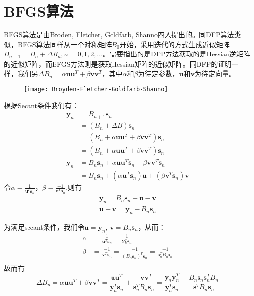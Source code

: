 \section{BFGS算法}

BFGS算法是由Broden, Fletcher, Goldfarb, Shanno四人提出的。同DFP算法类似，BFGS算法同样从一个对称矩阵$B_0$开始，采用迭代的方式生成近似矩阵$B_{n+1}=B_n+\Delta B_n, n=0,1,2,...$。需要指出的是DFP方法获取的是Hessian逆矩阵的近似矩阵，而BFGS方法则是获取Hessian矩阵的近似矩阵。同DFP的证明一样，我们另$\Delta B_n = \alpha \mathbf{uu}^T + \beta \mathbf{vv}^T$，其中$\alpha$和$\beta$为待定参数，$\mathbf{u}$和$\mathbf{v}$为待定向量。
\begin{figure}[htbp]
\centering
\texttt{[image: Broyden-Fletcher-Goldfarb-Shanno]}
\end{figure}

根据Secant条件我们有：
\begin{displaymath}
\begin{split}
\mathbf{y}_n &= B_{n+1} \mathbf{s}_n\\
 &= (B_n + \Delta B) \mathbf{s}_n\\
 &= (B_n + \alpha\mathbf{uu}^T + \beta \mathbf{vv}^T) \mathbf{s}_n\\
 &= (B_n + \alpha\mathbf{uu}^T + \beta \mathbf{vv}^T) \mathbf{s}_n\\
\mathbf{y}_n &= B_n \mathbf{s}_n + \alpha\mathbf{uu}^T \mathbf{s}_n + \beta \mathbf{vv}^T \mathbf{s}_n\\
&= B_n \mathbf{s}_n + (\alpha\mathbf{u}^T \mathbf{s}_n)\mathbf{u} + (\beta \mathbf{v}^T \mathbf{s}_n)\mathbf{v}
\end{split}
\end{displaymath}
令$\alpha=\frac{1}{\mathbf{u}^T \mathbf{s}_n}$，$\beta = \frac{-1}{\mathbf{v}^T \mathbf{s}_n}$,则有：
\begin{displaymath}
\begin{split}
\mathbf{y}_n = B_n \mathbf{s}_n + \mathbf{u} -  \mathbf{v}\\
\mathbf{u} -  \mathbf{v} =\mathbf{y}_n - B_n \mathbf{s}_n 
\end{split}
\end{displaymath}

为满足secant条件，我们令$\mathbf{u}= \mathbf{y}_n$, $\mathbf{v} = B_n\mathbf{s}_n$，从而：
\begin{displaymath}
\begin{split}
\alpha &=\frac{1}{\mathbf{u}^T \mathbf{s}_n} =\frac{1}{\mathbf{y}_n^T\mathbf{s}_n}\\
\beta &= \frac{-1}{\mathbf{v}^T \mathbf{s}_n} = \frac{-1}{(B_n\mathbf{s}_n)^T \mathbf{s}_n} = \frac{-1}{\mathbf{s}_n^T B_n \mathbf{s}_n}\\
\end{split}
\end{displaymath}
故而有：
\begin{displaymath}
\Delta B_n = \alpha\mathbf{uu}^T + \beta \mathbf{vv}^T
=\frac{\mathbf{uu}^T}{\mathbf{y}_n^T\mathbf{s}_n} + \frac{-\mathbf{vv}^T}{\mathbf{s}_n^T B_n \mathbf{s}_n}
=\frac{\mathbf{y}_n\mathbf{y}_n^T}{\mathbf{y}_n^T\mathbf{s}_n} - \frac{B_n\mathbf{s}_n\mathbf{s}_n^TB_n}{\mathbf{s}^T B_n \mathbf{s}_n}
\end{displaymath}

